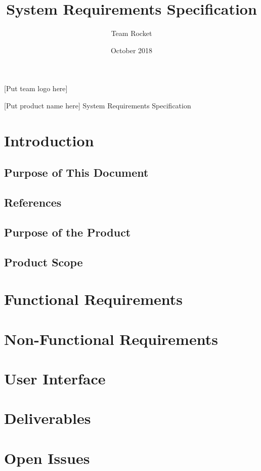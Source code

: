 \documentclass{article}
\title{System Requirements Specification}
\author{Team Rocket}
\date{October 2018}
\begin{document}
\maketitle

\newpage

[Put team logo here]

[Put product name here]
System Requirements Specification

\tableofcontents
\newpage

\section{Introduction}
\subsection{Purpose of This Document}
\subsection{References}
\subsection{Purpose of the Product}
\subsection{Product Scope}
\section{Functional Requirements}
\section{Non-Functional Requirements}
\section{User Interface}
\section{Deliverables}
\section{Open Issues}
\end{document}
